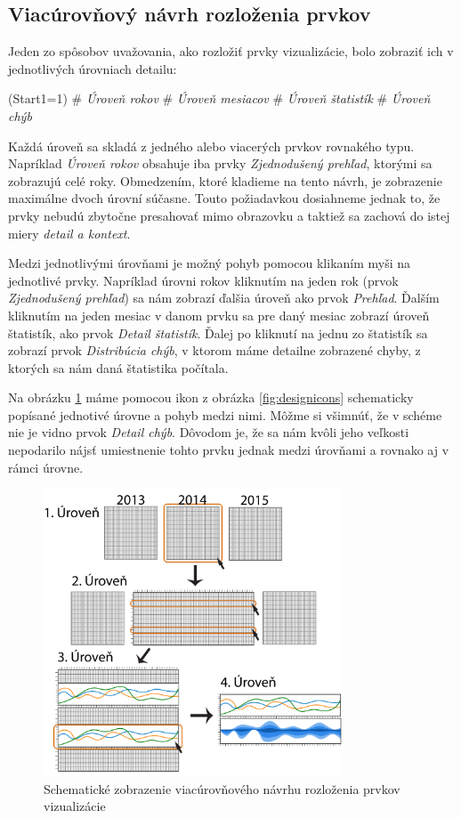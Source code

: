 \subsection{Viacúrovňový návrh rozloženia prvkov}
Jeden zo spôsobov uvažovania, ako rozložiť prvky vizualizácie, bolo zobraziť ich v jednotlivých úrovniach detailu: 
\begin{easylist}
	\ListProperties(Start1=1)
	# \textit{Úroveň rokov}
	# \textit{Úroveň mesiacov}
	# \textit{Úroveň štatistík}
	# \textit{Úroveň chýb} 
\end{easylist}
Každá úroveň sa skladá z jedného alebo viacerých prvkov rovnakého typu. Napríklad \textit{Úroveň rokov} obsahuje iba prvky \textit{Zjednodušený prehľad}, ktorými sa zobrazujú celé roky. Obmedzením, ktoré kladieme na tento návrh, je zobrazenie maximálne dvoch úrovní súčasne. Touto požiadavkou dosiahneme jednak to, že prvky nebudú zbytočne presahovať mimo obrazovku a taktiež sa zachová do istej miery \textit{detail a kontext}. 

Medzi jednotlivými úrovňami je možný pohyb pomocou klikaním myši na jednotlivé prvky. Napríklad úrovni rokov kliknutím na jeden rok (prvok \textit{Zjednodušený prehľad}) sa nám zobrazí ďalšia úroveň ako prvok \textit{Prehľad}. Ďalším kliknutím na jeden mesiac v danom prvku sa pre daný mesiac zobrazí úroveň štatistík, ako prvok \textit{Detail štatistík}. Ďalej po kliknutí na jednu zo štatistík sa zobrazí prvok \textit{Distribúcia chýb}, v ktorom máme detailne zobrazené chyby, z ktorých sa nám daná štatistika počítala.

Na obrázku \ref{fig:multilevellayout} máme pomocou ikon z obrázka \ref{fig:designicons} schematicky popísané jednotivé úrovne a pohyb medzi nimi. Môžme si všimnúť, že v schéme nie je vidno prvok \textit{Detail chýb}. Dôvodom je, že sa nám kvôli jeho veľkosti nepodarilo nájsť umiestnenie tohto prvku jednak medzi úrovňami a rovnako aj v rámci úrovne.

\begin{figure}
	\centering
	\includegraphics[width = 3.5in]{multilevellayout}
	\caption{Schematické zobrazenie viacúrovňového návrhu rozloženia prvkov vizualizácie}
	\label{fig:multilevellayout}
\end{figure}


